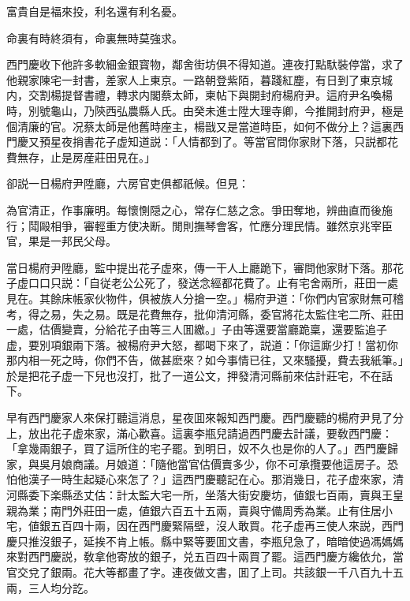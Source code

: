 \begin{myquote}
富貴自是福來投，利名還有利名憂。

命裏有時終須有，命裏無時莫強求。
\end{myquote}

西門慶收下他許多軟細金銀寳物，鄰舍街坊俱不得知道。連夜打點馱裝停當，求了他親家陳宅一封書，差家人上東京。一路朝登紫陌，暮踐紅塵，有日到了東京城内，交割楊提督書禮，轉求内閣蔡太師，柬帖下與開封府楊府尹。這府尹名喚楊時，別號龜山，乃陝西弘農縣人氏。由癸未進士陞大理寺卿，今推開封府尹，極是個清廉的官。况蔡太師是他舊時座主，楊戩又是當道時臣，如何不做分上？這裏西門慶又預星夜捎書花子虚知道説：「人情都到了。等當官問你家財下落，只説都花費無存，止是房産莊田見在。」

卻説一日楊府尹陞廳，六房官吏俱都祇候。但見：

\begin{myquote}
為官清正，作事廉明。每懷惻隠之心，常存仁慈之念。爭田奪地，辨曲直而後施行；鬦毆相爭，審輕重方使决断。閒則撫琴會客，忙應分理民情。雖然京兆宰臣官，果是一邦民父母。
\end{myquote}

當日楊府尹陞廳，監中提出花子虚來，傳一干人上廳跪下，審問他家財下落。那花子虚口口只説：「自従老公公死了，發送念經都花費了。止有宅舍兩所，莊田一處見在。其餘床帳家伙物件，俱被族人分搶一空。」楊府尹道：「你們内官家財無可稽考，得之易，失之易。既是花費無存，批仰清河縣，委官將花太監住宅二所、莊田一處，估價變賣，分給花子由等三人囬繳。」子由等還要當廳跪稟，還要監追子虚，要別項銀兩下落。被楊府尹大怒，都喝下來了，説道：「你這廝少打！當初你那内相一死之時，你們不告，做甚麽來？如今事情已往，又來騷擾，費去我紙筆。」於是把花子虚一下兒也沒打，批了一道公文，押發清河縣前來估計莊宅，不在話下。

早有西門慶家人來保打聽這消息，星夜囬來報知西門慶。西門慶聽的楊府尹見了分上，放出花子虚來家，滿心歡喜。這裏李瓶兒請過西門慶去計議，要敎西門慶：「拿幾兩銀子，買了這所住的宅子罷。到明日，奴不久也是你的人了。」西門慶歸家，與吳月娘商議。月娘道：「隨他當官估價賣多少，你不可承攬要他這房子。恐怕他漢子一時生起疑心來怎了？」這西門慶聽記在心。那消幾日，花子虚來家，清河縣委下楽縣丞丈估：計太監大宅一所，坐落大街安慶坊，値銀七百兩，賣與王皇親為業；南門外莊田一處，値銀六百五十五兩，賣與守備周秀為業。止有住居小宅，値銀五百四十兩，因在西門慶緊隔壁，沒人敢買。花子虚再三使人來説，西門慶只推沒銀子，延挨不肯上帳。縣中緊等要囬文書，李瓶兒急了，暗暗使過馮媽媽來對西門慶説，敎拿他寄放的銀子，兑五百四十兩買了罷。這西門慶方纔依允，當官交兌了銀兩。花大等都畫了字。連夜做文書，囬了上司。共該銀一千八百九十五兩，三人均分訖。

